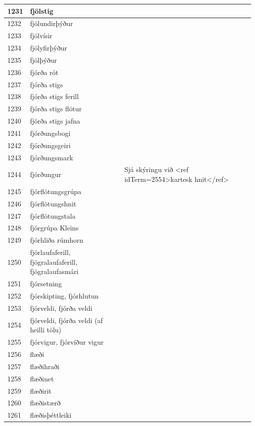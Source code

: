 \begin{longtable}{p{}|p{}|p{}|p{}|p{}}
\hline
1231 & fjölstig &  &  &  \\
\hline
1232 & fjölundirþýður &  &  &  \\
\hline
1233 & fjölvísir &  &  &  \\
\hline
1234 & fjölyfirþýður &  &  &  \\
\hline
1235 & fjölþýður &  &  &  \\
\hline
1236 & fjórða rót &  &  &  \\
\hline
1237 & fjórða stigs &  &  &  \\
\hline
1238 & fjórða stigs ferill &  &  &  \\
\hline
1239 & fjórða stigs flötur &  &  &  \\
\hline
1240 & fjórða stigs jafna &  &  &  \\
\hline
1241 & fjórðungsbogi &  &  &  \\
\hline
1242 & fjórðungsgeiri &  &  &  \\
\hline
1243 & fjórðungsmark &  &  &  \\
\hline
1244 & fjórðungur & Sjá skýringu við <ref idTerm=2554>kartesk hnit</ref> &  &  \\
\hline
1245 & fjórflötungsgrúpa &  &  &  \\
\hline
1246 & fjórflötungshnit &  &  &  \\
\hline
1247 & fjórflötungstala &  &  &  \\
\hline
1248 & fjórgrúpa Kleins &  &  &  \\
\hline
1249 & fjórhliða rúmhorn &  &  &  \\
\hline
1250 & fjórlaufaferill, fjögralaufaferill, fjögralaufasmári &  &  &  \\
\hline
1251 & fjórsetning &  &  &  \\
\hline
1252 & fjórskipting, fjórhlutun &  &  &  \\
\hline
1253 & fjórveldi, fjórða veldi &  &  &  \\
\hline
1254 & fjórveldi, fjórða veldi (af heilli tölu) &  &  &  \\
\hline
1255 & fjórvigur, fjórvíður vigur &  &  &  \\
\hline
1256 & flæði &  &  &  \\
\hline
1257 & flæðihraði &  &  &  \\
\hline
1258 & flæðinet &  &  &  \\
\hline
1259 & flæðirit &  &  &  \\
\hline
1260 & flæðistærð &  &  &  \\
\hline
1261 & flæðisþéttleiki &  &  &  \\

\end{longtable}
